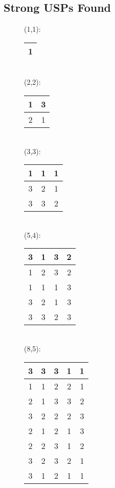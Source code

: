 \documentclass[11pt]{article}
\begin{document}
\subsection{Strong USPs Found}
\label{subsec:usps_found}

\begin{figure}
  \label{fig:examples}
  \begin{multicols}{4}
  (1,1):\\[.5ex]
  \begin{tabular}{|c|}
    \hline
    1 \\ \hline
  \end{tabular}\\[6ex]

  (2,2):\\[.5ex]
  \begin{tabular}{|c|c|}
    \hline
    1&3 \\ \hline
    2&1 \\ \hline
  \end{tabular}\\[16ex]

  (3,3):\\[.5ex]
  \begin{tabular}{|c|c|c|}
    \hline
    1&1&1 \\ \hline
    3&2&1 \\ \hline
    3&3&2 \\ \hline
    \end{tabular}\\[2ex]

  (5,4):\\[.5ex]
  \begin{tabular}{|c|c|c|c|}
    \hline
    3&1&3&2 \\ \hline
    1&2&3&2 \\ \hline
    1&1&1&3 \\ \hline 
    3&2&1&3 \\ \hline 
    3&3&2&3 \\ \hline
  \end{tabular}\\[10ex]

  (8,5):\\[.5ex]
  \begin{tabular}{|c|c|c|c|c|}
    \hline
    3&3&3&1&1 \\ \hline
    1&1&2&2&1 \\ \hline
    2&1&3&3&2 \\ \hline
    3&2&2&2&3 \\ \hline
    2&1&2&1&3 \\ \hline
    2&2&3&1&2 \\ \hline
    3&2&3&2&1 \\ \hline
    3&1&2&1&1 \\ \hline
  \end{tabular}\\[16ex]
    

\end{multicols}
\end{figure}
\end{document}
